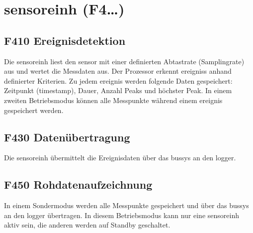 \section{\gls{sensoreinh} (F4\ldots)}


\subsection{F410 Ereignisdetektion}
Die \gls{sensoreinh} liest den \gls{sensor} mit einer definierten Abtastrate (Samplingrate) aus und wertet die Messdaten aus. Der Prozessor erkennt \glspl{ereignis} anhand definierter Kriterien. Zu jedem \gls{ereignis} werden folgende Daten gespeichert: Zeitpunkt (\gls{timestamp}), Dauer, Anzahl Peaks und höchster Peak. In einem zweiten Betriebsmodus können alle Messpunkte während einem \gls{ereignis} gespeichert werden.


\subsection{F430 Datenübertragung}
Die \gls{sensoreinh} übermittelt die Ereignisdaten über das \gls{bussys} an den \gls{logger}.


\subsection{F450 Rohdatenaufzeichnung}
In einem Sondermodus werden alle Messpunkte gespeichert und über das \gls{bussys} an den \gls{logger} übertragen. In diesem Betriebsmodus kann nur eine \gls{sensoreinh} aktiv sein, die anderen werden auf Standby geschaltet.


